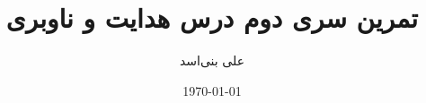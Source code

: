 \documentclass[12pt,onecolumn,a4paper]{article}
\begin{document}
	\title{تمرین سری دوم درس هدایت و ناوبری} 
	\author{علی بنی‌اسد}
	\date{\today}
	\maketitle
	
	
	 
	
	
	
	
	
	
	
	
	
	
	
	\newpage
	\tableofcontents
	\listoffigures
	\listoftables
\end{document}
